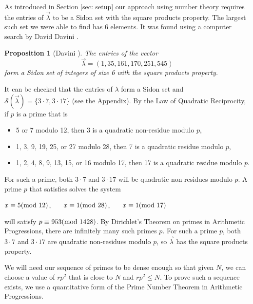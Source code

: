 \documentclass[12pt]{article}%
\newtheorem{proposition}[theorem]{Proposition}
\begin{document}
As introduced in Section \ref{sec: setup} our approach using number theory requires the 
entries of $\vec{ \lambda}$ to be a Sidon set with the square products property.  
The largest such set we were able to find has 6 elements.  It was found using a computer search by David Davini \cite{David}.  

\begin{proposition}[Davini \cite{David}]\label{prop:size 6}
    The entries of the vector 
    \[
    \vec{\lambda} = ( 1,35,161,170,251,545)
    \]
    form a Sidon set of integers of size 6 with the square products property.  
        \end{proposition} 

It can be checked that the entries of $\lambda$ form a Sidon set and $\mathcal{S}( \vec{ \lambda} ) = \{3 \cdot  7 , 3 \cdot 17 \}$ (see the Appendix).  By the Law of Quadratic Reciprocity, if $p$ is a prime that is 
\begin{itemize}
    \item 5 or 7 modulo 12, then 3 is a quadratic non-residue modulo $p$,
    \item 1, 3, 9, 19, 25, or 27 modulo 28, then 7 is a quadratic residue modulo $p$,
    \item 1, 2, 4, 8, 9, 13, 15, or 16 modulo 17, then 17 is a quadratic residue modulo $p$.  
\end{itemize}
For such a prime, both $3 \cdot 7$ and $3 \cdot 17$ will be quadratic non-residues modulo $p$.  A prime $p$ that satisfies solves the system  
\begin{center}
    $x \equiv 5 ( \textup{mod}~12)$, ~~~$x \equiv 1 ( \textup{mod}~28)$, ~~~$x \equiv 1 ( \textup{mod}~17)$ 
\end{center}
will satisfy $p \equiv 953 ( \textup{mod}~1428)$.  By Dirichlet's Theorem on primes in Arithmetic Progressions, there are infinitely many such primes $p$.  
For such a prime $p$, both $3 \cdot 7$ and 
$3 \cdot 17$ are quadratic non-residues modulo $p$, so 
$\vec{\lambda}$ has the square products property.  

We will need our sequence of primes to be dense enough so that given $N$, we can choose a value of $rp^2$ that is close to $N$ and $rp^2 \leq N$.  To prove such a sequence exists, we use a quantitative form of the Prime Number Theorem in Arithmetic Progressions.   
\end{document}
